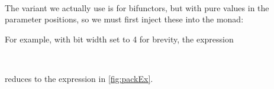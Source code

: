 \documentclass[fleqn,runningheads]{llncs}
\begin{document}
\begin{AgdaAlign}
\begin{code}
\AgdaSpace{}%
%
\>[28]\AgdaSymbol{=}\AgdaSpace{}%
\<%
\\
%
\>[2]\AgdaSpace{}%
\AgdaSpace{}%
%
\>[28]\AgdaSymbol{=}\AgdaSpace{}%
\<%
\end{code}
The variant we actually use is for bifunctors, but with pure values in the parameter positions, so we must first inject these into the monad:
\begin{code}%
%
\>[2]\AgdaSpace{}%
\AgdaSpace{}%
\AgdaSymbol{=}\AgdaSpace{}%
\AgdaSpace{}%
\AgdaSpace{}%
\AgdaSpace{}%
\AgdaSpace{}%
\AgdaSpace{}%
\AgdaSpace{}%
\<%
\end{code}
\end{AgdaAlign}
For example, with bit width set to 4 for brevity, the expression
\begin{code}[hide]%
\>[0]\AgdaSpace{}%
\AgdaSpace{}%
\AgdaSymbol{:}\AgdaSpace{}%
\AgdaSpace{}%
\AgdaSymbol{(}\AgdaSpace{}%
\AgdaSpace{}%
\AgdaSpace{}%
\AgdaSymbol{)}\<%
\\
\>[0]%
\>[12]\AgdaSymbol{=}\<%
\end{code}
\begin{code}%
\>[0][@{}l@{\AgdaIndent{1}}]%
\>[2]\AgdaSpace{}%
\AgdaSpace{}%
\AgdaSymbol{(}\AgdaSpace{}%
\AgdaSymbol{)}\AgdaSpace{}%
\AgdaSymbol{(}\AgdaSpace{}%
\AgdaSymbol{(}\AgdaSpace{}%
\AgdaSpace{}%
\AgdaSpace{}%
\AgdaSpace{}%
\AgdaSpace{}%
\AgdaSpace{}%
\AgdaInductiveConstructor{[]}\AgdaSymbol{))}\AgdaSpace{}%
\AgdaInductiveConstructor{[]}\<%
\end{code}
reduces to the expression in \cref{fig:packEx}.
\end{document}

